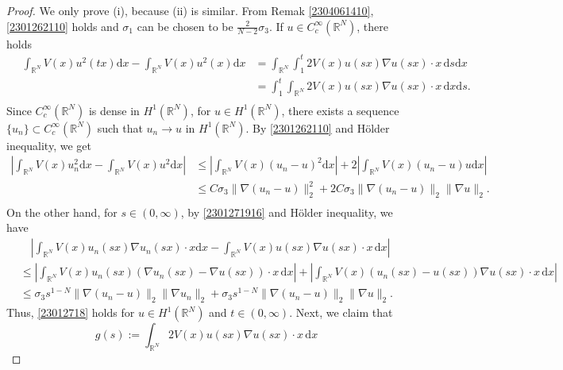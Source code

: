 \documentclass[10pt]{article}
\numberwithin{equation}{section}
\newcommand{\ud}{\mathrm{d}}
\numberwithin{equation}{section}
\begin{document}
\begin{proof}%
We only prove (i), because (ii) is similar. From Remak \ref{2304061410}, \eqref{2301262110} holds and $\sigma_1$ can be chosen to be $\frac{2}{N-2}\sigma_3$. If $u\in C_c^{\infty}(\mathbb{R}^N)$, there holds
\begin{equation}\label{23012718}
\begin{aligned}
\quad \int_{\mathbb{R}^N} V(x)u^2(tx) \ud x-\int_{\mathbb{R}^N} V(x)u^2(x) \ud x & = \int_{\mathbb{R}^N}\int_1^t 2V(x)u(sx)\nabla u(sx)\cdot x \,\ud s \ud x\\
& = \int_1^t\int_{\mathbb{R}^N} 2V(x)u(sx)\nabla u(sx)\cdot x \, \ud x\ud s.\\
\end{aligned}
\end{equation}
Since $C_c^{\infty}(\mathbb{R}^N)$ is dense in $H^1(\mathbb{R}^N)$, for $u\in H^1(\mathbb{R}^N)$, there exists a sequence $\{u_n\}\subset C_c^{\infty}(\mathbb{R}^N)$ such that $u_n\to u$ in $H^1(\mathbb{R}^N)$. By \eqref{2301262110} and H\"{o}lder inequality, we get
\[
\begin{aligned}
\left|\int_{\mathbb{R}^N} V(x)u_n^2 \ud x-\int_{\mathbb{R}^N} V(x)u^2\ud x\right| &\le \left|\int_{\mathbb{R}^N} V(x)(u_n-u)^2\ud x\right|+2\left|\int_{\mathbb{R}^N} V(x)(u_n-u)u\ud x\right|\\
& \le C\sigma_3\|\nabla (u_n-u)\|_2^2+2C\sigma_3\|\nabla (u_n-u)\|_2\|\nabla u\|_2.\\
\end{aligned}
\]
On the other hand, for $s\in (0, \infty)$, by \eqref{2301271916} and H\"{o}lder inequality, we have
\[
\begin{aligned}
&\quad \left|\int_{\mathbb{R}^N} V(x)u_n(sx)\nabla u_n(sx)\cdot x \ud x-\int_{\mathbb{R}^N} V(x)u(sx)\nabla u(sx)\cdot x \, \ud x\right|\\
& \le \left|\int_{\mathbb{R}^N} V(x)u_n(sx)(\nabla u_n(sx)-\nabla u(sx))\cdot x \, \ud x\right|+\left|\int_{\mathbb{R}^N} V(x)(u_n(sx)-u(sx))\nabla u(sx)\cdot x \, \ud x\right|\\
& \le {\sigma_3} s^{1-{N}}\|\nabla (u_n-u)\|_2\|\nabla u_n\|_2+{\sigma_3} s^{1-{N}}\|\nabla (u_n-u)\|_2\|\nabla u\|_2.
\end{aligned}
\]
Thus, \eqref{23012718} holds for $u\in H^1(\mathbb{R}^N)$ and $t\in (0, \infty)$. Next, we claim that
\begin{equation}\label{2301271802}
g(s):=\int_{\mathbb{R}^N} 2V(x)u(sx)\nabla u(sx)\cdot x \, \ud x
\end{equation}

\end{proof}
\end{document}
